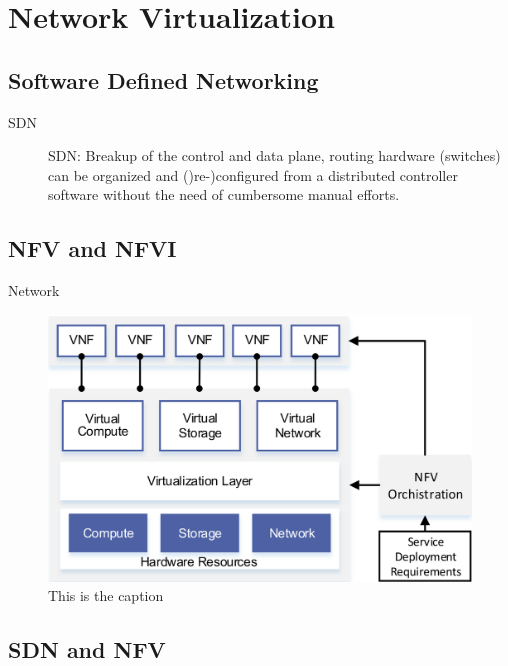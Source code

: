 \section{Network Virtualization}

\subsection{Software Defined Networking}
\begin{description}
	\item [SDN] SDN: Breakup of the control and data plane, routing hardware (switches) can be organized and ()re-)configured from a distributed controller software without the need of cumbersome manual efforts.
\end{description}

\subsection{NFV and NFVI}
Network 

\begin{figure}[H]
	\centering
	\includegraphics[width=1\linewidth]{images/nfvi.png}
	\caption{This is the caption \cite{li2015software}}
	\label{img:nfvi}
\end{figure}

\subsection{SDN and NFV}

